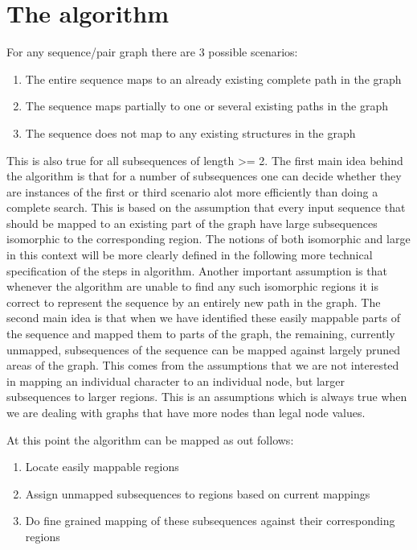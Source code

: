 \documentclass[thesis.tex]{subfiles}
\begin{document}
\section{The algorithm}
For any sequence/pair graph there are 3 possible scenarios:
\begin{enumerate}
	\item{The entire sequence maps to an already existing complete path in the graph}
	\item{The sequence maps partially to one or several existing paths in the graph}
	\item{The sequence does not map to any existing structures in the graph}
\end{enumerate}
This is also true for all subsequences of length >= 2. The first main idea behind the algorithm is that for a number of subsequences one can decide whether they are instances of the first or third scenario alot more efficiently than doing a complete search. This is based on the assumption that every input sequence that should be mapped to an existing part of the graph have large subsequences isomorphic to the corresponding region. The notions of both isomorphic and large in this context will be more clearly defined in the following more technical specification of the steps in algorithm. Another important assumption is that whenever the algorithm are unable to find any such isomorphic regions it is correct to represent the sequence by an entirely new path in the graph. The second main idea is that when we have identified these easily mappable parts of the sequence and mapped them to parts of the graph, the remaining, currently unmapped, subsequences of the sequence can be mapped against largely pruned areas of the graph. This comes from the assumptions that we are not interested in mapping an individual character to an individual node, but larger subsequences to larger regions. This is an assumptions which is always true when we are dealing with graphs that have more nodes than legal node values. \\
\par\noindent
At this point the algorithm can be mapped as out follows:
\begin{enumerate}
	\item{Locate easily mappable regions}
	\item{Assign unmapped subsequences to regions based on current mappings}
	\item{Do fine grained mapping of these subsequences against their corresponding regions}
\end{enumerate}
\end{document}
